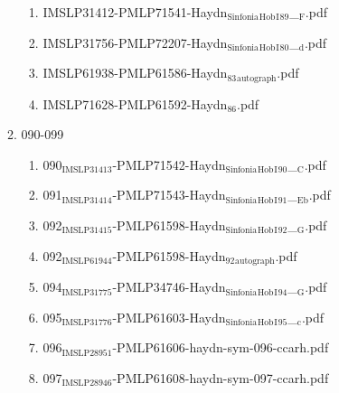 \documentclass[11pt]{article}
\begin{document}
\begin{enumerate}
\begin{enumerate}
\begin{enumerate}
\item IMSLP31412-PMLP71541-Haydn$_{\text{Sinfonia}}$$_{\text{Hob}}$$_{\text{I}}$$_{\text{89}}$\_$_{\text{F}}$.pdf
\label{sec-1-1-1-1-44-38-7-9-6}

\item IMSLP31756-PMLP72207-Haydn$_{\text{Sinfonia}}$$_{\text{Hob}}$$_{\text{I}}$$_{\text{80}}$\_$_{\text{d}}$.pdf
\label{sec-1-1-1-1-44-38-7-9-7}

\item IMSLP61938-PMLP61586-Haydn$_{\text{83}}$$_{\text{autograph}}$.pdf
\label{sec-1-1-1-1-44-38-7-9-8}

\item IMSLP71628-PMLP61592-Haydn$_{\text{86}}$.pdf
\label{sec-1-1-1-1-44-38-7-9-9}
\end{enumerate}

\item 090-099
\label{sec-1-1-1-1-44-38-7-10}
\begin{enumerate}
\item 090$_{\text{IMSLP31413}}$-PMLP71542-Haydn$_{\text{Sinfonia}}$$_{\text{Hob}}$$_{\text{I}}$$_{\text{90}}$\_$_{\text{C}}$.pdf
\label{sec-1-1-1-1-44-38-7-10-1}

\item 091$_{\text{IMSLP31414}}$-PMLP71543-Haydn$_{\text{Sinfonia}}$$_{\text{Hob}}$$_{\text{I}}$$_{\text{91}}$\_$_{\text{Eb}}$.pdf
\label{sec-1-1-1-1-44-38-7-10-2}

\item 092$_{\text{IMSLP31415}}$-PMLP61598-Haydn$_{\text{Sinfonia}}$$_{\text{Hob}}$$_{\text{I}}$$_{\text{92}}$\_$_{\text{G}}$.pdf
\label{sec-1-1-1-1-44-38-7-10-3}

\item 092$_{\text{IMSLP61944}}$-PMLP61598-Haydn$_{\text{92}}$$_{\text{autograph}}$.pdf
\label{sec-1-1-1-1-44-38-7-10-4}

\item 094$_{\text{IMSLP31775}}$-PMLP34746-Haydn$_{\text{Sinfonia}}$$_{\text{Hob}}$$_{\text{I}}$$_{\text{94}}$\_$_{\text{G}}$.pdf
\label{sec-1-1-1-1-44-38-7-10-5}

\item 095$_{\text{IMSLP31776}}$-PMLP61603-Haydn$_{\text{Sinfonia}}$$_{\text{Hob}}$$_{\text{I}}$$_{\text{95}}$\_$_{\text{c}}$.pdf
\label{sec-1-1-1-1-44-38-7-10-6}

\item 096$_{\text{IMSLP28951}}$-PMLP61606-haydn-sym-096-ccarh.pdf
\label{sec-1-1-1-1-44-38-7-10-7}

\item 097$_{\text{IMSLP28946}}$-PMLP61608-haydn-sym-097-ccarh.pdf
\label{sec-1-1-1-1-44-38-7-10-8}


\end{enumerate}
\end{enumerate}
\end{enumerate}
\end{document}
